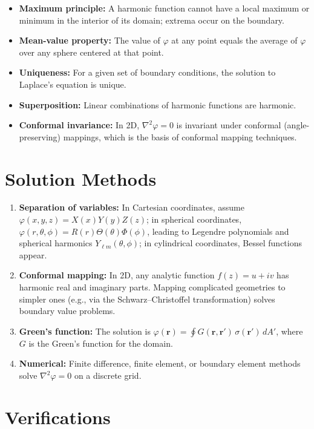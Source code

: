 \begin{itemize}
  \item \textbf{Maximum principle:} A harmonic function cannot have a local maximum or minimum in the interior of its domain; extrema occur on the boundary.
  \item \textbf{Mean-value property:} The value of $\varphi$ at any point equals the average of $\varphi$ over any sphere centered at that point.
  \item \textbf{Uniqueness:} For a given set of boundary conditions, the solution to Laplace's equation is unique.
  \item \textbf{Superposition:} Linear combinations of harmonic functions are harmonic.
  \item \textbf{Conformal invariance:} In 2D, $\nabla^{2}\varphi = 0$ is invariant under conformal (angle-preserving) mappings, which is the basis of conformal mapping techniques.
\end{itemize}
\section*{Solution Methods}

\begin{enumerate}
  \item \textbf{Separation of variables:} In Cartesian coordinates, assume $\varphi(x,y,z) = X(x)Y(y)Z(z)$; in spherical coordinates, $\varphi(r,\theta,\phi) = R(r)\Theta(\theta)\Phi(\phi)$, leading to Legendre polynomials and spherical harmonics $Y_{\ell m}(\theta,\phi)$; in cylindrical coordinates, Bessel functions appear.
  \item \textbf{Conformal mapping:} In 2D, any analytic function $f(z) = u + iv$ has harmonic real and imaginary parts. Mapping complicated geometries to simpler ones (e.g., via the Schwarz--Christoffel transformation) solves boundary value problems.
  \item \textbf{Green's function:} The solution is $\varphi(\mathbf{r}) = \oint G(\mathbf{r},\mathbf{r}')\,\sigma(\mathbf{r}')\,dA'$, where $G$ is the Green's function for the domain.
  \item \textbf{Numerical:} Finite difference, finite element, or boundary element methods solve $\nabla^{2}\varphi = 0$ on a discrete grid.
\end{enumerate}
\section*{Verifications}

